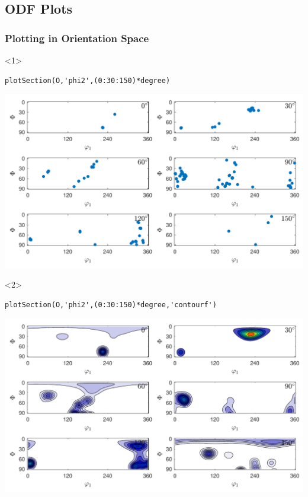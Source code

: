 \documentclass[compress]{beamer}
\begin{document}
\subsection*{ODF Plots}

\begin{frame}[fragile]
  \frametitle{Plotting in Orientation Space}

  \begin{onlyenv}<1>
    \begin{lstlisting}[style=input]
plotSection(O,'phi2',(0:30:150)*degree)
    \end{lstlisting}
    \includegraphics[width=\textwidth]{pic/odfOri}
  \end{onlyenv}

  \begin{onlyenv}<2>
    \begin{lstlisting}[style=input]
plotSection(O,'phi2',(0:30:150)*degree,'contourf')
    \end{lstlisting}
    \includegraphics[width=\textwidth]{pic/odfOriSmooth}
  \end{onlyenv}


\end{frame}
\end{document}
